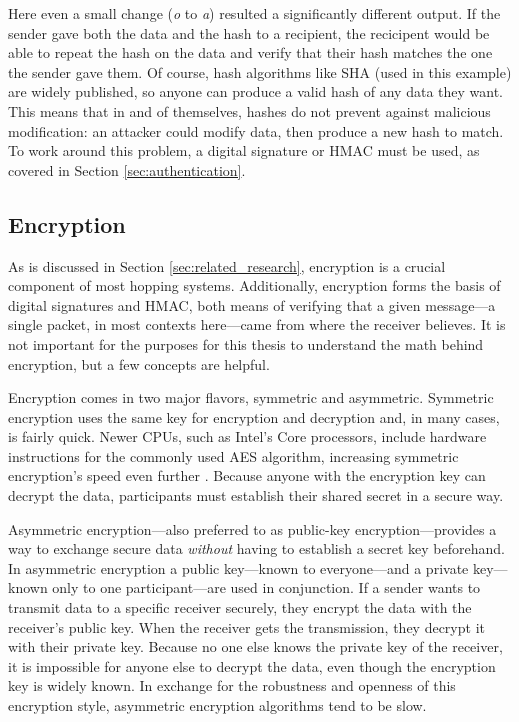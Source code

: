 \par Here even a small change (\textit{o} to \textit{a}) resulted a significantly different output. If the sender gave both the data and the hash to a recipient, the recicipent would be able to repeat the hash on the data and verify that their hash matches the one the sender gave them. Of course, hash algorithms like \ac{SHA} (used in this example) are widely published, so anyone can produce a valid hash of any data they want. This means that in and of themselves, hashes do not prevent against malicious modification: an attacker could modify data, then produce a new hash to match. To work around this problem, a digital signature or \ac{HMAC} must be used, as covered in Section \ref{sec:authentication}.

\subsection{Encryption}
\label{sec:encryption}
\par As is discussed in Section \ref{sec:related_research}, encryption is a crucial component of most hopping systems. Additionally, encryption forms the basis of digital signatures and \ac{HMAC}, both means of verifying that a given message---a single packet, in most contexts here---came from where the receiver believes. It is not important for the purposes for this thesis to understand the math behind encryption, but a few concepts are helpful.

\par Encryption comes in two major flavors, symmetric and asymmetric. Symmetric encryption uses the same key for encryption and decryption and, in many cases, is fairly quick. Newer \acp{CPU}, such as Intel's Core processors, include hardware instructions for the commonly used \ac{AES} algorithm, increasing symmetric encryption's speed even further \cite{IntelAES}. Because anyone with the encryption key can decrypt the data, participants must establish their shared secret in a secure way.

\par Asymmetric encryption---also preferred to as public-key encryption---provides a way to exchange secure data \textit{without} having to establish a secret key beforehand. In asymmetric encryption a public key---known to everyone---and a private key---known only to one participant---are used in conjunction. If a sender wants to transmit data to a specific receiver securely, they encrypt the data with the receiver's public key. When the receiver gets the transmission, they decrypt it with their private key. Because no one else knows the private key of the receiver, it is impossible for anyone else to decrypt the data, even though the encryption key is widely known. In exchange for the robustness and openness of this encryption style, asymmetric encryption algorithms tend to be slow.

